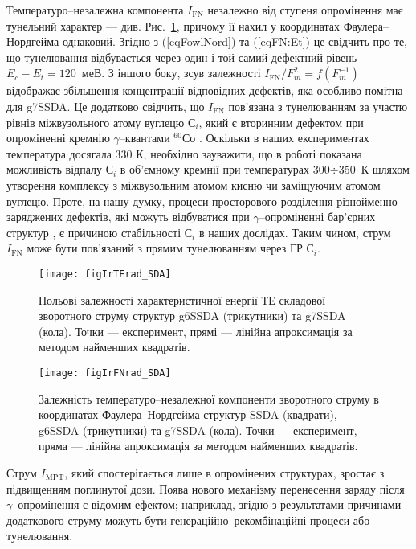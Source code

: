 Температуро--незалежна компонента $I_\mathrm{FN}$ незалежно від ступеня опромінення має тунельний характер --- див. Рис.~\ref{figIrTErad_SDA},
причому її нахил у координатах Фаулера--Нордгейма однаковий.
Згідно з (\ref{eqFowlNord}) та (\ref{eqFN:Et}) це свідчить про те, що тунелювання відбувається через один і той самий дефектний рівень $E_c-E_t=120$~меВ.
З іншого боку,
зсув залежності $I_\mathrm{FN}/F_m^2=f(F_m^{-1})$ відображає збільшення концентрації відповідних дефектів, яка
особливо помітна для g7SSDA.
Це додатково свідчить, що $I_\mathrm{FN}$ пов'язана з тунелюванням за участю рівнів міжвузольного атому вуглецю С$_i$,
який є вторинним дефектом при опроміненні кремнію $\gamma$--квантами $^{60}$Со \cite{Vavilov1990r}.
Оскільки в наших експериментах температура досягала 330 К, необхідно зауважити, що в роботі \cite{Song1987} показана можливість відпалу С$_i$
 в об’ємному кремнії при температурах 300$\div$350~К шляхом утворення комплексу з міжвузольним атомом кисню чи заміщуючим атомом вуглецю.
Проте, на нашу думку, процеси просторового розділення різнойменно--заряджених дефектів, які можуть відбуватися при $\gamma$--опроміненні бар’єрних структур \cite{Muzafarova}, є причиною стабільності С$_i$ в наших дослідах.
Таким чином, струм $I_\mathrm{FN}$ може бути пов'язаний з прямим  тунелюванням через ГР С$_i$.

\begin{figure}
\center
\texttt{[image: figIrTErad\_SDA]}
\caption{\label{figIrTErad_SDA}
Польові залежності характеристичної енергії ТЕ складової зворотного струму структур g6SSDA (трикутники) та g7SSDA (кола).
Точки --- експеримент, прямі --- лінійна апроксимація за методом найменших квадратів.
}%
\end{figure}


\begin{figure}
\center
\texttt{[image: figIrFNrad\_SDA]}
\caption{\label{figIrFNrad_SDA}
Залежність температуро--незалежної компоненти зворотного струму
в координатах Фаулера--Нордгейма
структур SSDA (квадрати), g6SSDA (трикутники) та g7SSDA (кола).
Точки --- експеримент, пряма --- лінійна апроксимація за методом найменших квадратів.
}%
\end{figure}


Струм $I_\mathrm{MPT}$, який спостерігається лише в опромінених структурах, зростає з підвищенням поглинутої дози.
Поява нового механізму перенесення заряду після $\gamma$--опромінення є відомим ефектом;
наприклад, згідно з результатами \cite{Gullu:2008,Karatas:2005NIMA} причинами додаткового струму можуть бути генераційно--рекомбінаційні процеси або
тунелювання.

